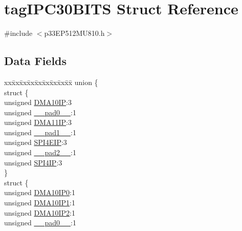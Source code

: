 \hypertarget{structtag_i_p_c30_b_i_t_s}{}\section{tag\+I\+P\+C30\+B\+I\+TS Struct Reference}
\label{structtag_i_p_c30_b_i_t_s}


{\ttfamily \#include $<$p33\+E\+P512\+M\+U810.\+h$>$}

\subsection*{Data Fields}
\begin{DoxyCompactItemize}
\item 
\begin{tabbing}
xx\=xx\=xx\=xx\=xx\=xx\=xx\=xx\=xx\=\kill
union \{\\
\>struct \{\\
\>\>unsigned \hyperlink{structtag_i_p_c30_b_i_t_s_a173499117e73c011c3f16d3ea0ae2cd1}{DMA10IP}:3\\
\>\>unsigned \hyperlink{structtag_i_p_c30_b_i_t_s_adf71f3d8410c1f1dbbc96680a92c49af}{\_\_pad0\_\_}:1\\
\>\>unsigned \hyperlink{structtag_i_p_c30_b_i_t_s_a8cd4fe440b0c3e57962b31253898c560}{DMA11IP}:3\\
\>\>unsigned \hyperlink{structtag_i_p_c30_b_i_t_s_acaf2d0924a107ec6e8d2e31febaf66f9}{\_\_pad1\_\_}:1\\
\>\>unsigned \hyperlink{structtag_i_p_c30_b_i_t_s_ada3ffa58fe3753c3c867059dd27d56e6}{SPI4EIP}:3\\
\>\>unsigned \hyperlink{structtag_i_p_c30_b_i_t_s_a4d97cc5f7d51d22fc2bf3eab35c9cb7f}{\_\_pad2\_\_}:1\\
\>\>unsigned \hyperlink{structtag_i_p_c30_b_i_t_s_a7e178805064da5cf224bb3988beb6c76}{SPI4IP}:3\\
\>\} \\
\>struct \{\\
\>\>unsigned \hyperlink{structtag_i_p_c30_b_i_t_s_a346bf1056ac502ce3dc624c7b94f3612}{DMA10IP0}:1\\
\>\>unsigned \hyperlink{structtag_i_p_c30_b_i_t_s_a443a74691fc3f55bb3a887879d8241ba}{DMA10IP1}:1\\
\>\>unsigned \hyperlink{structtag_i_p_c30_b_i_t_s_a3cf70bd59133ce5fe160ef698da9d57a}{DMA10IP2}:1\\
\>\>unsigned \hyperlink{structtag_i_p_c30_b_i_t_s_adf71f3d8410c1f1dbbc96680a92c49af}{\_\_pad0\_\_}:1\\

\end{tabbing}
\end{DoxyCompactItemize}
